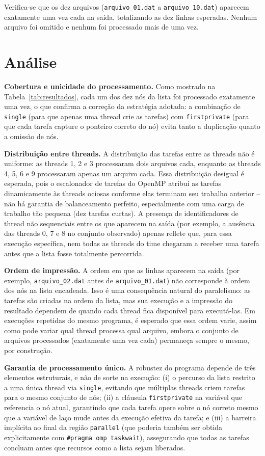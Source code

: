 \documentclass[a4paper,12pt]{article}
\begin{document}
Verifica-se que os dez arquivos (\texttt{arquivo\_01.dat} a \texttt{arquivo\_10.dat}) aparecem exatamente uma vez cada na saída, totalizando as dez linhas esperadas. Nenhum arquivo foi omitido e nenhum foi processado mais de uma vez.

\section{Análise}

\textbf{Cobertura e unicidade do processamento.} Como mostrado na Tabela~\ref{tab:resultados}, cada um dos dez nós da lista foi processado exatamente uma vez, o que confirma a correção da estratégia adotada: a combinação de \texttt{single} (para que apenas uma thread crie as tarefas) com \texttt{firstprivate} (para que cada tarefa capture o ponteiro correto do nó) evita tanto a duplicação quanto a omissão de nós.

\textbf{Distribuição entre threads.} A distribuição das tarefas entre as threads não é uniforme: as threads 1, 2 e 3 processaram dois arquivos cada, enquanto as threads 4, 5, 6 e 9 processaram apenas um arquivo cada. Essa distribuição desigual é esperada, pois o escalonador de tarefas do OpenMP atribui as tarefas dinamicamente às threads ociosas conforme elas terminam seu trabalho anterior -- não há garantia de balanceamento perfeito, especialmente com uma carga de trabalho tão pequena (dez tarefas curtas). A presença de identificadores de thread não sequenciais entre os que aparecem na saída (por exemplo, a ausência das threads 0, 7 e 8 no conjunto observado) apenas reflete que, para essa execução específica, nem todas as threads do time chegaram a receber uma tarefa antes que a lista fosse totalmente percorrida.

\textbf{Ordem de impressão.} A ordem em que as linhas aparecem na saída (por exemplo, \texttt{arquivo\_02.dat} antes de \texttt{arquivo\_01.dat}) não corresponde à ordem dos nós na lista encadeada. Isso é uma consequência natural do paralelismo: as tarefas são criadas na ordem da lista, mas sua execução e a impressão do resultado dependem de quando cada thread fica disponível para executá-las. Em execuções repetidas do mesmo programa, é esperado que essa ordem varie, assim como pode variar qual thread processa qual arquivo, embora o conjunto de arquivos processados (exatamente uma vez cada) permaneça sempre o mesmo, por construção.

\textbf{Garantia de processamento único.} A robustez do programa depende de três elementos estruturais, e não de sorte na execução: (i) o percurso da lista restrito a uma única thread via \texttt{single}, evitando que múltiplas threads criem tarefas para o mesmo conjunto de nós; (ii) a cláusula \texttt{firstprivate} na variável que referencia o nó atual, garantindo que cada tarefa opere sobre o nó correto mesmo que a variável de laço mude antes da execução efetiva da tarefa; e (iii) a barreira implícita ao final da região \texttt{parallel} (que poderia também ser obtida explicitamente com \texttt{\#pragma omp taskwait}), assegurando que todas as tarefas concluam antes que recursos como a lista sejam liberados.
\end{document}
